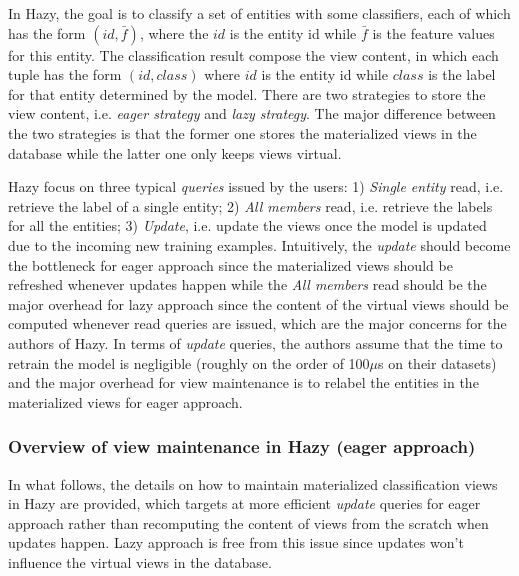 In Hazy, the goal is to classify a set of entities with some classifiers, each of which has the form $(id, \bar{f})$, where the $id$ is the entity id while $\bar{f}$ is the feature values for this entity. The classification result compose the view content, in which each tuple has the form $(id, class)$ where $id$ is the entity id while $class$ is the label for that entity determined by the model. There are two strategies to store the view content, i.e. {\em eager strategy} and {\em lazy strategy}. The major difference between the two strategies is that the former one stores the materialized views in the database while the latter one only keeps views virtual.

Hazy focus on three typical {\em queries} issued by the users: 1) {\em Single entity} read, i.e. retrieve the label of a single entity; 2) {\em All members} read, i.e. retrieve the labels for all the entities; 3) {\em Update}, i.e. update the views once the model is updated due to the incoming new training examples. Intuitively, the {\em update} should become the bottleneck for eager approach since the materialized views should be refreshed whenever updates happen while the {\em All members} read should be the major overhead for lazy approach since the content of the virtual views should be computed whenever read queries are issued, which are the major concerns for the authors of Hazy. In terms of {\em update} queries, the authors assume that the time to retrain the model is negligible (roughly on the order of 100$\mu$s on their datasets) and the major overhead for view maintenance is to relabel the entities in the materialized views for eager approach. 

\subsubsection{Overview of view maintenance in Hazy (eager approach)}
In what follows, the details on how to maintain materialized classification views in Hazy are provided, which targets at more efficient {\em update} queries for eager approach rather than recomputing the content of views from the scratch when updates happen. Lazy approach is free from this issue since updates won't influence the virtual views in the database. 

